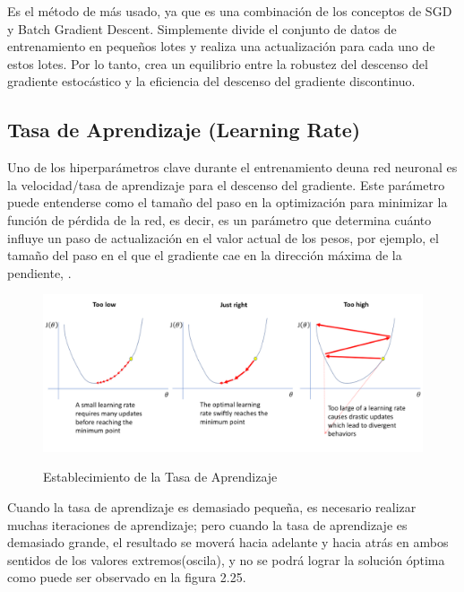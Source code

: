 			Es el método de más usado, ya que es una combinación de los conceptos de SGD y Batch Gradient Descent. Simplemente divide el conjunto de datos de entrenamiento en pequeños lotes y realiza una actualización para cada uno de estos lotes. Por lo tanto, crea un equilibrio entre la robustez del descenso del gradiente estocástico y la eficiencia del descenso del gradiente discontinuo.





	\subsection{Tasa de Aprendizaje (Learning Rate)}
		Uno de los hiperparámetros clave durante el entrenamiento deuna red neuronal es la velocidad/tasa de aprendizaje para el descenso del gradiente.
		Este parámetro puede entenderse como el tamaño del paso en la optimización para minimizar la función de pérdida de la red, es decir, es un parámetro que determina cuánto influye un paso de actualización en el valor actual de los pesos, por ejemplo, el tamaño del paso en el que el gradiente cae en la dirección máxima de la pendiente, \citep {AdamImg}.

		\begin{figure}[H]
		\includegraphics[width=1\textwidth]{images/desarrollo/entrenamiento/LR}
		\begin{center}
		\caption{\small{Establecimiento de la Tasa de Aprendizaje}}
		\vspace{-0.5em}
		{\small{\cite{AdamImg}}}
		\end{center}
		\vspace{-1.5em}
		\end{figure}

		Cuando la tasa de aprendizaje es demasiado pequeña, es necesario realizar muchas iteraciones de aprendizaje; pero cuando la tasa de aprendizaje es demasiado grande, el resultado se moverá hacia adelante y hacia atrás en ambos sentidos de los valores extremos(oscila), y no se podrá lograr la solución óptima como puede ser observado en la figura 2.25.

